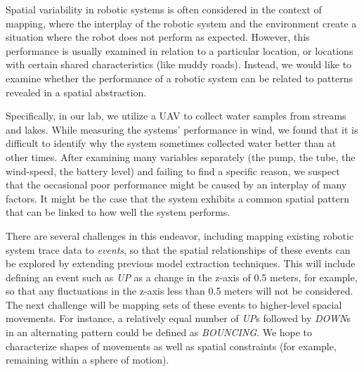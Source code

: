 Spatial variability in robotic systems is often considered in the context of mapping, where the interplay of the robotic system and the environment create a situation where the robot does not perform as expected.
However, this performance is usually examined in relation to a particular location, or locations with certain shared characteristics (like muddy roads).
Instead, we would like to examine whether the performance of a robotic system can be related to patterns revealed in a spatial abstraction.

Specifically, in our lab, we utilize a UAV to collect water samples from streams and lakes.
While measuring the systems' performance in wind, we found that it is difficult to identify why the system sometimes collected water better than at other times.
After examining many variables separately (the pump, the tube, the wind-speed, the battery level) and failing to find a specific reason, we suspect that the occasional poor performance might be caused by an interplay of many factors.
It might be the case that the system exhibits a common spatial pattern that can be linked to how well the system performs.




There are several challenges in this endeavor, including mapping existing robotic system trace data to \emph{events}, so that the spatial relationships of these events can be explored by extending previous model extraction techniques. 
This will include defining an event such as \emph{UP} as a change in the z-axis of 0.5 meters, for example, so that any fluctuations in the z-axis less than 0.5 meters will not be considered.  
The next challenge will be mapping sets of these events to higher-level spacial movements.  
For instance, a relatively equal number of \emph{UP}s followed by \emph{DOWN}s in an alternating pattern could be defined as \emph{BOUNCING}.
We hope to characterize shapes of movements as well as spatial constraints (for example, remaining within a sphere of motion). 

